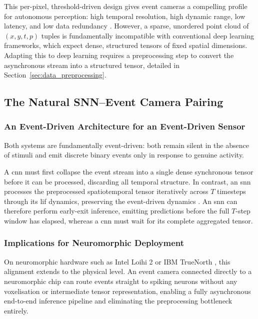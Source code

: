 This per-pixel, threshold-driven design gives event cameras a compelling profile for autonomous perception: high temporal resolution, high dynamic range, low latency, and low data redundancy \cite{gallego2020event}.
However, a sparse, unordered point cloud of $(x, y, t, p)$ tuples is fundamentally incompatible with conventional deep learning frameworks, which expect dense, structured tensors of fixed spatial dimensions.
Adapting this to deep learning requires a preprocessing step to convert the asynchronous stream into a structured tensor, detailed in Section~\ref{sec:data_preprocessing}.

\subsection{The Natural SNN--Event Camera Pairing}
\label{subsec:bg_snn_event_pairing}

\subsubsection*{An Event-Driven Architecture for an Event-Driven Sensor}

Both systems are fundamentally event-driven: both remain silent in the absence of stimuli and emit discrete binary events only in response to genuine activity.

A \gls{cnn} must first collapse the event stream into a single dense synchronous tensor before it can be processed, discarding all temporal structure.
In contrast, an \gls{snn} processes the preprocessed spatiotemporal tensor iteratively across $T$ timesteps through its \gls{lif} dynamics, preserving the event-driven dynamics \cite{gallego2020event, pfeiffer_snn_opportunities}.
An \gls{snn} can therefore perform early-exit inference, emitting predictions before the full $T$-step window has elapsed, whereas a \gls{cnn} must wait for its complete aggregated tensor.

\subsubsection*{Implications for Neuromorphic Deployment}

On neuromorphic hardware such as Intel Loihi 2 \cite{gralewicz2024spikes} or IBM TrueNorth \cite{merolla2014million}, this alignment extends to the physical level.
An event camera connected directly to a neuromorphic chip can route events straight to spiking neurons without any voxelisation or intermediate tensor representation, enabling a fully asynchronous end-to-end inference pipeline and eliminating the preprocessing bottleneck entirely.
